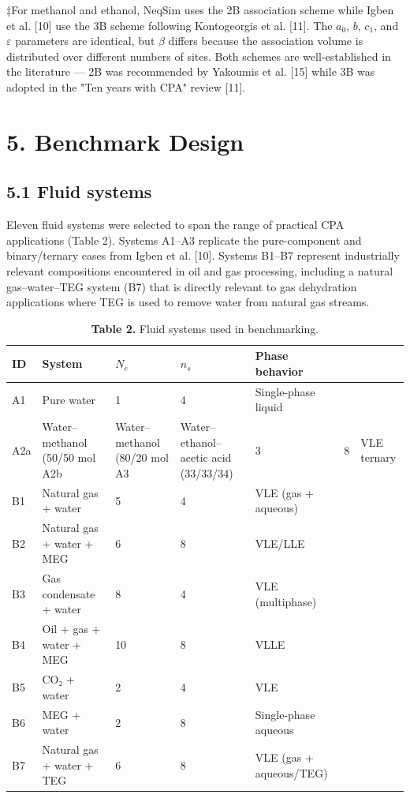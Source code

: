 \documentclass[review,3p]{elsarticle}
\begin{document}
‡For methanol and ethanol, NeqSim uses the 2B association scheme while Igben et al. [10] use the 3B scheme following Kontogeorgis et al. [11]. The $a_0$, $b$, $c_1$, and $\varepsilon$ parameters are identical, but $\beta$ differs because the association volume is distributed over different numbers of sites. Both schemes are well-established in the literature — 2B was recommended by Yakoumis et al. [15] while 3B was adopted in the "Ten years with CPA" review [11].


\section{5. Benchmark Design}



\subsection{5.1 Fluid systems}

Eleven fluid systems were selected to span the range of practical CPA applications (Table 2). Systems A1–A3 replicate the pure-component and binary/ternary cases from Igben et al. [10]. Systems B1–B7 represent industrially relevant compositions encountered in oil and gas processing, including a natural gas–water–TEG system (B7) that is directly relevant to gas dehydration applications where TEG is used to remove water from natural gas streams.


\begin{table}[htbp]
\centering
\caption{\textbf{Table 2.} Fluid systems used in benchmarking.}
\begin{tabular}{lllll}
\toprule
ID & System & $N_c$ & $n_s$ & Phase behavior \\
\midrule
A1 & Pure water & 1 & 4 & Single-phase liquid \\
A2a & Water–methanol (50/50 mol%
A2b & Water–methanol (80/20 mol%
A3 & Water–ethanol–acetic acid (33/33/34) & 3 & 8 & VLE ternary \\
B1 & Natural gas + water & 5 & 4 & VLE (gas + aqueous) \\
B2 & Natural gas + water + MEG & 6 & 8 & VLE/LLE \\
B3 & Gas condensate + water & 8 & 4 & VLE (multiphase) \\
B4 & Oil + gas + water + MEG & 10 & 8 & VLLE \\
B5 & CO₂ + water & 2 & 4 & VLE \\
B6 & MEG + water & 2 & 8 & Single-phase aqueous \\
B7 & Natural gas + water + TEG & 6 & 8 & VLE (gas + aqueous/TEG) \\
\bottomrule
\end{tabular}
\end{table}
\end{document}
